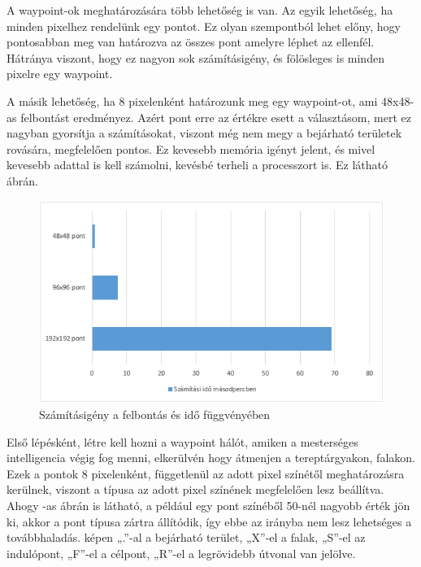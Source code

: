 A waypoint-ok meghatározására több lehetőség is van. Az egyik lehetőség, ha minden pixelhez rendelünk egy pontot. Ez olyan szempontból lehet előny, hogy pontosabban meg van határozva az összes pont amelyre léphet az ellenfél. Hátránya viszont, hogy ez nagyon sok számításigény, és fölösleges is minden pixelre egy waypoint.

A másik lehetőség, ha 8 pixelenként határozunk meg egy waypoint-ot, ami 48x48-as felbontást eredményez. Azért pont erre az értékre esett a választásom, mert ez nagyban gyorsítja a számításokat, viszont még nem megy a bejárható területek rovására, megfelelően pontos. Ez kevesebb memória igényt jelent, és mivel kevesebb adattal is kell számolni, kevésbé terheli a processzort is. Ez látható  ábrán.


\begin{figure}[h]
\centering
\includegraphics[scale=0.9]{kepek/utvonal_szamitas_diagram_waypointokra.png}
\caption{Számításigény a felbontás és idő függvényében}
\label{fig:diagram_utvonal}
\end{figure}

Első lépésként, létre kell hozni a waypoint hálót, amiken a mesterséges intelligencia végig fog menni, elkerülvén hogy átmenjen a tereptárgyakon, falakon. Ezek a pontok 8 pixelenként, függetlenül az adott pixel színétől meghatározásra kerülnek, viszont a típusa az adott pixel színének megfelelően lesz beállítva. Ahogy -as ábrán is látható, a például egy pont színéből 50-nél nagyobb érték jön ki, akkor a pont típusa zártra állítódik, így ebbe az irányba nem lesz lehetséges a továbbhaladás.   képen „.”-al a bejárható terület, „X”-el a falak, „S”-el az indulópont, „F”-el a célpont, „R”-el a legrövidebb útvonal van jelölve.

